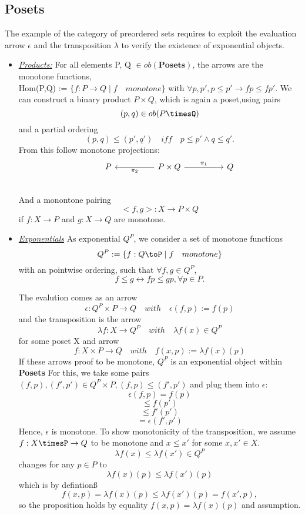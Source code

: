   \subsection{\textbf{Posets}}
  The example of the category of preordered sets requires to exploit the evaluation arrow $\epsilon$ and the transposition $\lambda$ to verify the existence of exponential objects.
    \begin{itemize}
  \item \underline{\textit{Products:}}
    For all elements P, Q $\in ob(\textbf{Posets})$, the arrows are the monotone functions,
    \\ Hom(P,Q) := $\{f: P \to Q \mid f \quad  monotone \}$ with $\forall p,p', p\leq p' \to f p \leq f p'$.
  We can construct a binary product $P \times Q$, which is again a poset,using pairs $$(p,q) \in ob(P\timesQ)$$ and a partial ordering $$(p,q) \leq (p',q') \quad iff\quad p \leq p' \wedge q \leq q' .$$
  From this follow monotone projections: \\
\[
  \begin{tikzcd}
    & P && P\times Q \arrow{ll}{\pi_2} \arrow{rr}{\pi_1}  &&  Q\\
  \end{tikzcd}
\]
  And a monontone pairing
  $$ <f,g>: X \to P\times Q$$
  if $f:X \to P$ and $g: X\to Q$ are monotone.

\item \underline{\textit{Exponentials}}
  As exponential $Q^P$, we consider a set of monotone functions
  $$Q^P:=\{f:Q\toP \mid f \quad monotone \}$$
  with an pointwise ordering, such that $\forall f,g \in Q^P$,
  $$ f \leq g \leftrightarrow f p \leq g p,\forall p \in P.$$

  The evalution comes as an arrow
  $$\epsilon: Q^P\times P \to Q \quad with \quad \epsilon(f,p):=f(p)$$
  and the transposition is the arrow
  $$\lambda f : X \to Q^P \quad with \quad \lambda f(x) \in Q^P$$
  for some poset X and arrow
  $$f:X \times P \to Q \quad with \quad f(x,p):=\lambda f(x)(p)$$
  If these arrows proof to be monotone, $Q^P$ is an exponential object within \textbf{Posets}
  For this, we take some pairs $(f,p),(f',p')\in Q^P\times P, (f,p)\leq(f',p')$ and plug them into $\epsilon$:
  $$\epsilon(f,p) = f(p)$$
  $$\leq f(p')$$
  $$\leq f'(p') $$
  $$=\epsilon(f',p') $$
  Hence, $\epsilon$ is monotone. To show monotonicity of the transposition, we assume
  $f:X\timesP\to Q$ to be monotone and $x\leq x'$ for some $x,x' \in X$.
  $$\lambda f(x) \leq \lambda f(x') \in Q^P$$
  changes for any $p \in P$ to
  $$\lambda f(x)(p)\leq \lambda f(x')(p)$$
  which is by defintionß
  $$f(x,p)= \lambda f (x)(p) \leq \lambda f(x')(p) = f(x',p),$$
  so the proposition holds by equality $f(x,p)=\lambda f (x)(p)$ and assumption.
  \end{itemize}
  \newpage

